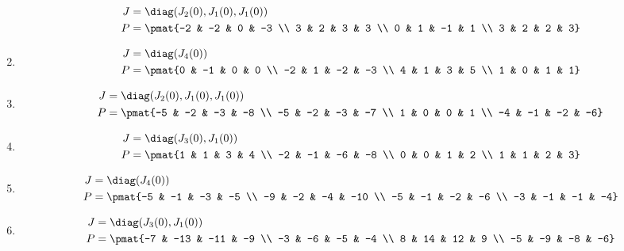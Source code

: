 \begin{enumerate}
\begin{align*}
J &= \diag(J_{2}(0), J_{1}(0), J_{1}(0))\\
P &= \pmat{-2 & -2 & 0 & -3 \\ 3 & 2 & 3 & 3 \\ 0 & 1 & -1 & 1 \\ 3 & 2 & 2 & 3}
\end{align*}

\item

\begin{align*}
J &= \diag(J_{4}(0))\\
P &= \pmat{0 & -1 & 0 & 0 \\ -2 & 1 & -2 & -3 \\ 4 & 1 & 3 & 5 \\ 1 & 0 & 1 & 1}
\end{align*}

\item

\begin{align*}
J &= \diag(J_{2}(0), J_{1}(0), J_{1}(0))\\
P &= \pmat{-5 & -2 & -3 & -8 \\ -5 & -2 & -3 & -7 \\ 1 & 0 & 0 & 1 \\ -4 & -1 & -2 & -6}
\end{align*}

\item

\begin{align*}
J &= \diag(J_{3}(0), J_{1}(0))\\
P &= \pmat{1 & 1 & 3 & 4 \\ -2 & -1 & -6 & -8 \\ 0 & 0 & 1 & 2 \\ 1 & 1 & 2 & 3}
\end{align*}

\item

\begin{align*}
J &= \diag(J_{4}(0))\\
P &= \pmat{-5 & -1 & -3 & -5 \\ -9 & -2 & -4 & -10 \\ -5 & -1 & -2 & -6 \\ -3 & -1 & -1 & -4}
\end{align*}

\item

\begin{align*}
J &= \diag(J_{3}(0), J_{1}(0))\\
P &= \pmat{-7 & -13 & -11 & -9 \\ -3 & -6 & -5 & -4 \\ 8 & 14 & 12 & 9 \\ -5 & -9 & -8 & -6}
\end{align*}


\end{enumerate}
